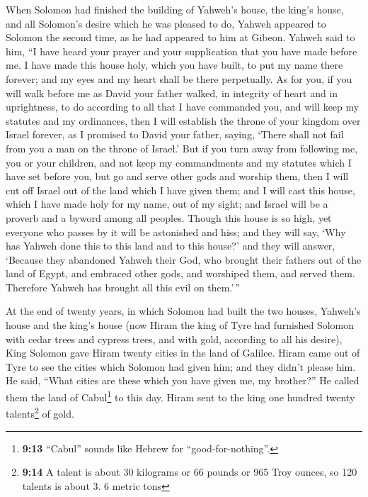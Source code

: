  When Solomon had finished the building of Yahweh's house,
the king's house, and all Solomon's desire which he was pleased to do,
 Yahweh appeared to Solomon the second time, as he had
appeared to him at Gibeon.  Yahweh said to him, ``I have
heard your prayer and your supplication that you have made before me. I
have made this house holy, which you have built, to put my name there
forever; and my eyes and my heart shall be there perpetually.
 As for you, if you will walk before me as David your
father walked, in integrity of heart and in uprightness, to do according
to all that I have commanded you, and will keep my statutes and my
ordinances,  then I will establish the throne of your
kingdom over Israel forever, as I promised to David your father, saying,
`There shall not fail from you a man on the throne of Israel.'
 But if you turn away from following me, you or your
children, and not keep my commandments and my statutes which I have set
before you, but go and serve other gods and worship them, 
then I will cut off Israel out of the land which I have given them; and
I will cast this house, which I have made holy for my name, out of my
sight; and Israel will be a proverb and a byword among all peoples.
 Though this house is so high, yet everyone who passes by
it will be astonished and hiss; and they will say, `Why has Yahweh done
this to this land and to this house?'  and they will
answer, `Because they abandoned Yahweh their God, who brought their
fathers out of the land of Egypt, and embraced other gods, and worshiped
them, and served them. Therefore Yahweh has brought all this evil on
them.'\,''

 At the end of twenty years, in which Solomon had built
the two houses, Yahweh's house and the king's house  (now
Hiram the king of Tyre had furnished Solomon with cedar trees and
cypress trees, and with gold, according to all his desire), King Solomon
gave Hiram twenty cities in the land of Galilee.  Hiram
came out of Tyre to see the cities which Solomon had given him; and they
didn't please him.  He said, ``What cities are these
which you have given me, my brother?'' He called them the land of
Cabul\footnote{\textbf{9:13} ``Cabul'' sounds like Hebrew for
  ``good-for-nothing''.} to this day.  Hiram sent to the
king one hundred twenty talents\footnote{\textbf{9:14} A talent is about
  30 kilograms or 66 pounds or 965 Troy ounces, so 120 talents is about
  3. 6 metric tons} of gold.

